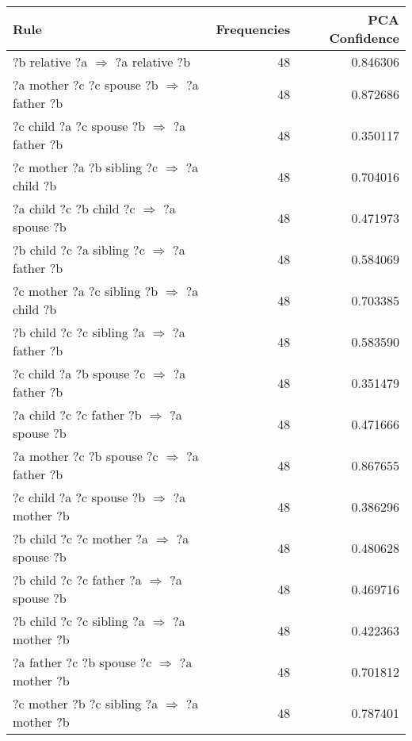 \begin{longtable}{lrr}
\toprule
                                                    Rule &  Frequencies &  PCA Confidence \\
\midrule
                  ?b  relative  ?a   $\Rightarrow$ ?a  relative  ?b &           48 &        0.846306 \\
      ?a  mother  ?c  ?c  spouse  ?b   $\Rightarrow$ ?a  father  ?b &           48 &        0.872686 \\
       ?c  child  ?a  ?c  spouse  ?b   $\Rightarrow$ ?a  father  ?b &           48 &        0.350117 \\
      ?c  mother  ?a  ?b  sibling  ?c   $\Rightarrow$ ?a  child  ?b &           48 &        0.704016 \\
        ?a  child  ?c  ?b  child  ?c   $\Rightarrow$ ?a  spouse  ?b &           48 &        0.471973 \\
      ?b  child  ?c  ?a  sibling  ?c   $\Rightarrow$ ?a  father  ?b &           48 &        0.584069 \\
      ?c  mother  ?a  ?c  sibling  ?b   $\Rightarrow$ ?a  child  ?b &           48 &        0.703385 \\
      ?b  child  ?c  ?c  sibling  ?a   $\Rightarrow$ ?a  father  ?b &           48 &        0.583590 \\
       ?c  child  ?a  ?b  spouse  ?c   $\Rightarrow$ ?a  father  ?b &           48 &        0.351479 \\
       ?a  child  ?c  ?c  father  ?b   $\Rightarrow$ ?a  spouse  ?b &           48 &        0.471666 \\
      ?a  mother  ?c  ?b  spouse  ?c   $\Rightarrow$ ?a  father  ?b &           48 &        0.867655 \\
       ?c  child  ?a  ?c  spouse  ?b   $\Rightarrow$ ?a  mother  ?b &           48 &        0.386296 \\
       ?b  child  ?c  ?c  mother  ?a   $\Rightarrow$ ?a  spouse  ?b &           48 &        0.480628 \\
       ?b  child  ?c  ?c  father  ?a   $\Rightarrow$ ?a  spouse  ?b &           48 &        0.469716 \\
      ?b  child  ?c  ?c  sibling  ?a   $\Rightarrow$ ?a  mother  ?b &           48 &        0.422363 \\
      ?a  father  ?c  ?b  spouse  ?c   $\Rightarrow$ ?a  mother  ?b &           48 &        0.701812 \\
     ?c  mother  ?b  ?c  sibling  ?a   $\Rightarrow$ ?a  mother  ?b &           48 &        0.787401 \\

\end{longtable}
